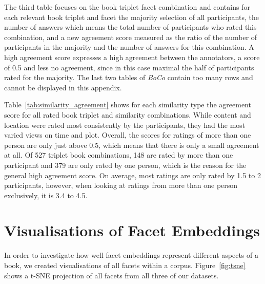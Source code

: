 \documentclass[11pt]{article}
\begin{document}
The third table focuses on the book triplet facet combination and contains for each relevant book triplet and facet the majority selection of all participants, the number of answers which means the total number of participants who rated this combination, and a new agreement score measured as the ratio of the number of participants in the majority and the number of answers for this combination.
A high agreement score expresses a high agreement between the annotators, a score of 0.5 and less no agreement, since in this case maximal the half of participants rated for the majority.
The last two tables of \emph{BoCo} contain too many rows and cannot be displayed in this appendix.

Table~\ref{tab:similarity_agreement} shows for each similarity type the agreement score for all rated book triplet and similarity combinations.
While content and location were rated most consistently by the participants, they had the most varied views on time and plot.
Overall, the scores for ratings of more than one person are only just above 0.5, which means that there is only a small agreement at all.
Of 527 triplet book combinations, 148 are rated by more than one participant and 379 are only rated by one person, which is the reason for the general high agreement score.
On average, most ratings are only rated by 1.5 to 2 participants, however, when looking at ratings from more than one person exclusively, it is 3.4 to 4.5.

\section{Visualisations of Facet Embeddings}
In order to investigate how well facet embeddings represent different aspects of a book, we created visualisations of all facets within a corpus.
Figure~\ref{fig:tsne} shows a t-SNE projection of all facets from all three of our datasets.
\end{document}
